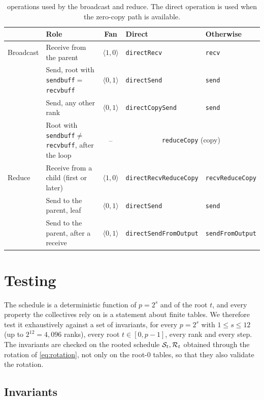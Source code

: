 \begin{table}[H]
\centering
\footnotesize
\setlength{\tabcolsep}{4pt}
\caption{\nccl{} operations used by the \bine{} broadcast and reduce. The direct operation is used when the zero-copy path is available.}
\label{tab:bine-bcast-calls}
\begin{tabularx}{\linewidth}{@{}l X c l l@{}}
\toprule
 & Role & Fan & Direct & Otherwise \\
\midrule
Broadcast & Receive from the parent & $\langle1,0\rangle$ & \texttt{directRecv} & \texttt{recv} \\
 & Send, root with \texttt{sendbuff}$=$\texttt{recvbuff} & $\langle0,1\rangle$ & \texttt{directSend} & \texttt{send} \\
 & Send, any other rank & $\langle0,1\rangle$ & \texttt{directCopySend} & \texttt{send} \\
 & Root with \texttt{sendbuff}$\neq$\texttt{recvbuff}, after the loop & -- & \multicolumn{2}{c}{\texttt{reduceCopy} (copy)} \\
\midrule
Reduce & Receive from a child (first or later) & $\langle1,0\rangle$ & \texttt{directRecvReduceCopy} & \texttt{recvReduceCopy} \\
 & Send to the parent, leaf & $\langle0,1\rangle$ & \texttt{directSend} & \texttt{send} \\
 & Send to the parent, after a receive & $\langle0,1\rangle$ & \texttt{directSendFromOutput} & \texttt{sendFromOutput} \\
\bottomrule
\end{tabularx}
\end{table}

\section{Testing}\label{sec:tree-testing}

The schedule is a deterministic function of $p=2^s$ and of the root $t$, and every property the collectives rely on is a statement about finite tables.
We therefore test it exhaustively against a set of invariants, for every $p=2^s$ with $1\le s\le 12$ (up to $2^{12}=4{,}096$ ranks), every root $t\in[0,p-1]$, every rank and every step.
The invariants are checked on the rooted schedule $\mathcal{S}_t,\mathcal{R}_t$ obtained through the rotation of \cref{eq:rotation}, not only on the root-$0$ tables, so that they also validate the rotation.

\subsection{Invariants}

